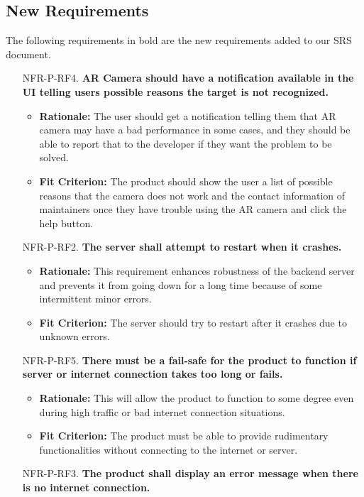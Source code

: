 \documentclass{article}
\begin{document}
\subsection{New Requirements}
The following requirements in bold are the new requirements added to our SRS document.
\begin{itemize}
	\item[NFR-P-RF4.] \textbf{AR Camera should have a notification available in the UI telling users possible reasons the target is not recognized.}
    \begin{itemize}
        \item \textbf{Rationale:} The user should get a notification telling them that AR camera may have a bad performance in some cases, and they should be able to report that to the developer if they want the problem to be solved.
        \item \textbf{Fit Criterion:} The product should show the user a list of possible reasons that the camera does not work and the contact information of maintainers once they have trouble using the AR camera and click the help button.
    \end{itemize}
        \item[NFR-P-RF2.] \textbf{The server shall attempt to restart when it crashes.}
    \begin{itemize}
        \item \textbf{Rationale:} This requirement enhances robustness of the backend server and prevents it from going down for a long time because of some intermittent minor errors.
        \item \textbf{Fit Criterion:} The server should try to restart after it crashes due to unknown errors.
    \end{itemize}
    \item[NFR-P-RF5.] \textbf{There must be a fail-safe for the product to function if server or internet connection takes too long or fails.}
    \begin{itemize}
        \item \textbf{Rationale:} This will allow the product to function to some degree even during high traffic or bad internet connection situations.
        \item \textbf{Fit Criterion:} The product must be able to provide rudimentary functionalities without connecting to the internet or server.
    \end{itemize}
    \item[NFR-P-RF3.] \textbf{The product shall display an error message when there is no internet connection.}

\end{itemize}
\end{document}
